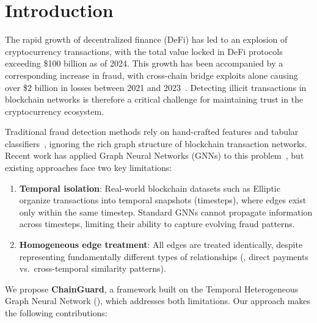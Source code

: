 \section{Introduction}

The rapid growth of decentralized finance (DeFi) has led to an explosion of cryptocurrency transactions, with the total value locked in DeFi protocols exceeding \$100 billion as of 2024. This growth has been accompanied by a corresponding increase in fraud, with cross-chain bridge exploits alone causing over \$2 billion in losses between 2021 and 2023~\cite{chainalysis2024}. Detecting illicit transactions in blockchain networks is therefore a critical challenge for maintaining trust in the cryptocurrency ecosystem.

Traditional fraud detection methods rely on hand-crafted features and tabular classifiers~\cite{weber2019anti}, ignoring the rich graph structure of blockchain transaction networks. Recent work has applied Graph Neural Networks (GNNs) to this problem~\cite{pareja2020evolvegcn, weber2019anti}, but existing approaches face two key limitations:

\begin{enumerate}
    \item \textbf{Temporal isolation}: Real-world blockchain datasets such as Elliptic~\cite{weber2019anti} organize transactions into temporal snapshots (timesteps), where edges exist only within the same timestep. Standard GNNs cannot propagate information across timesteps, limiting their ability to capture evolving fraud patterns.

    \item \textbf{Homogeneous edge treatment}: All edges are treated identically, despite representing fundamentally different types of relationships (\eg, direct payments vs.\ cross-temporal similarity patterns).
\end{enumerate}

We propose \textbf{ChainGuard}, a framework built on the Temporal Heterogeneous Graph Neural Network (\ours{}), which addresses both limitations. Our approach makes the following contributions:

